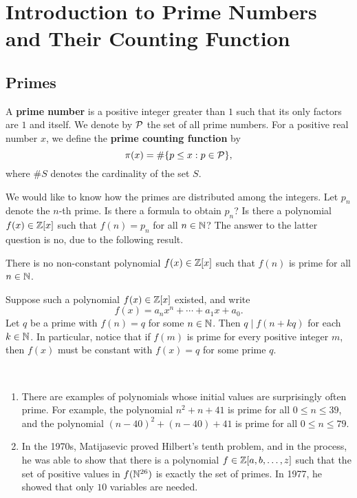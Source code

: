 \section{Introduction to Prime Numbers and Their Counting Function}\label{sec:1}

\subsection{Primes}\label{subsec:1.1}

\begin{defn}\label{def:1.1}
A {\bf prime number} is a positive integer greater than $1$ such that its only factors are $1$ and 
itself. We denote by ${\cal P}$ the set of all prime numbers. For a positive real number $x$, 
we define the {\bf prime counting function} by 
\[ \pi(x) = \#\{p \leq x : p \in {\cal P}\}, \]
where $\#S$ denotes the cardinality of the set $S$. 
\end{defn}

We would like to know how the primes are distributed among the integers. Let $p_n$ denote the 
$n$-th prime. Is there a formula to obtain $p_n$? Is there a polynomial $f(x) \in \mathbb{Z}[x]$ such that 
$f(n) = p_n$ for all $n \in \mathbb{N}$? The answer to the latter question is no, due to the following result. 

\begin{prop}\label{prop:1.2}
There is no non-constant polynomial $f(x) \in \mathbb{Z}[x]$ such that $f(n)$ is prime for all $n \in \mathbb{N}$. 
\end{prop}
\begin{pf}
Suppose such a polynomial $f(x) \in \mathbb{Z}[x]$ existed, and write 
\[ f(x) = a_n x^n + \cdots + a_1 x + a_0. \]
Let $q$ be a prime with $f(n) = q$ for some $n \in \mathbb{N}$. Then $q \mid f(n+kq)$ for each $k \in \mathbb{N}$. 
In particular, notice that if $f(m)$ is prime for every positive integer $m$, then $f(x)$ must be 
constant with $f(x) = q$ for some prime $q$. 
\end{pf}

\begin{remark}\label{remark:1.3}~
\begin{enumerate}[(1)]
    \item There are examples of polynomials whose initial values are surprisingly often prime. 
    For example, the polynomial $n^2 + n + 41$ is prime for all $0 \leq n \leq 39$, and the 
    polynomial $(n-40)^2 + (n-40) + 41$ is prime for all $0 \leq n \leq 79$. 
    \item In the 1970s, Matijasevic proved Hilbert's tenth problem, and in the process, he was able to
    show that there is a polynomial $f \in \mathbb{Z}[a, b, \dots, z]$ such that the set of positive 
    values in $f(\mathbb{N}^{26})$ is exactly the set of primes. In 1977, he showed that only $10$ variables 
    are needed.
\end{enumerate}
\end{remark}

